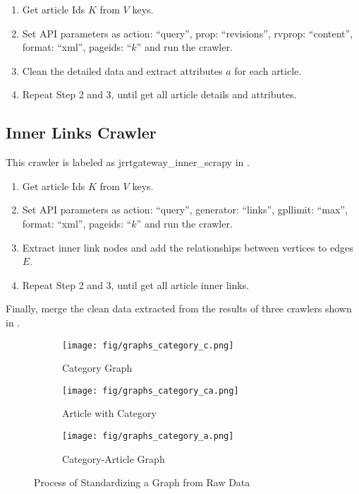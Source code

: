 \begin{enumerate}
	\item Get article Ids $K$ from $V$ keys.
	\item Set API parameters as {action: ``query'', prop: ``revisions'', rvprop: ``content'', format: ``xml'', pageids: ``$k$''} and run the crawler. 
	\item Clean the detailed data and extract attributes $a$ for each article.
	\item Repeat Step 2 and 3, until get all article details and attributes.
\end{enumerate}

\subsection{Inner Links Crawler}

This crawler is labeled as jrrtgateway\_inner\_scrapy in .

\begin{enumerate}
	\item Get article Ids $K$ from $V$ keys.
	\item Set API parameters as {action: ``query'', generator: ``links'', gpllimit: ``max'', format: ``xml'', pageids: ``$k$''} and run the crawler. 
	\item Extract inner link nodes and add the relationships between vertices to edges $E$.
	\item Repeat Step 2 and 3, until get all article inner links.
\end{enumerate}

Finally, merge the clean data extracted from the results of three crawlers shown in .

\begin{figure}
	\centering
	\begin{subfigure}{0.31\textwidth}
		\texttt{[image: fig/graphs\_category\_c.png]}
		\caption{Category Graph} 
		\label{fig:section2-pic2}
	\end{subfigure}
	\hspace*{\fill} %
	\begin{subfigure}{0.31\textwidth}
		\texttt{[image: fig/graphs\_category\_ca.png]}
		\caption{Article with Category} \label{fig:section2-pic3}
	\end{subfigure}
	\hspace*{\fill} %
	\begin{subfigure}{0.31\textwidth}
		\texttt{[image: fig/graphs\_category\_a.png]}
		\caption{Category-Article Graph} \label{fig:section2-pic4}
	\end{subfigure}
	\caption{Process of Standardizing a Graph from Raw Data} \label{fig:section2-pic234}
\end{figure}

